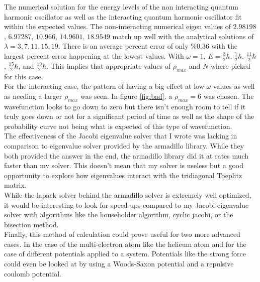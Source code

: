 \documentclass[%
 reprint,
 amsmath,amssymb,
 aps,
]{revtex4-1}
\begin{document}

The numerical solution for the energy levels of the non interacting quantum harmonic oscillator as well as the interacting quantum harmonic oscillator fit within the expected values. The non-interacting numerical eigen values of $2.98198$, $6.97287$, $10.966$, $14.9601$, $18.9549$ match up well with the analytical solutions of  $\lambda = 3,7,11,15,19$. There is an average percent error of only \%0.36 with the largest percent error happening at the lowest values. With $\omega = 1$, $E = \frac{3}{2}\hbar$, $\frac{7}{2}\hbar$, $\frac{11}{2}\hbar$, $\frac{15}{2}\hbar$, and $\frac{19}{2}\hbar$. This implies that appropriate values of $\rho_{max}$ and $N$ where picked for this case. \\

For the interacting case, the pattern of having a big effect at low $\omega$ values as well as needing a larger $\rho_{max}$ was seen. In figure \ref{fig:bad}, a $\rho_{max} = 6$ was chosen. The wavefunction looks to go down to zero but there isn't enough room to tell if it truly goes down or not for a significant period of time as well as the shape of the probability curve not being what is expected of this type of wavefunction. \\

The effectiveness of the Jacobi eigenvalue solver that I wrote was lacking in comparison to eigenvalue solver provided by the armadillo library. While they both provided the answer in the end, the armadillo library did it at rates much faster than my solver. This doesn't mean that my solver is useless but a good opportunity to explore how eigenvalues interact with the tridiagonal Toeplitz matrix. \\

While the lapack solver behind the armadillo solver is extremely well optimized, it would be interesting to look for speed ups compared to my Jacobi eigenvalue solver with algorithms like the householder algorithm, cyclic jacobi, or the bisection method. \\

Finally, this method of calculation could prove useful for two more advanced cases. In the case of the multi-electron atom like the helieum atom and for the case of different potentials applied to a system. Potentials like the strong force could even be looked at by using a Woods-Saxon potential and a repulsive coulomb potential. \\
\end{document}
